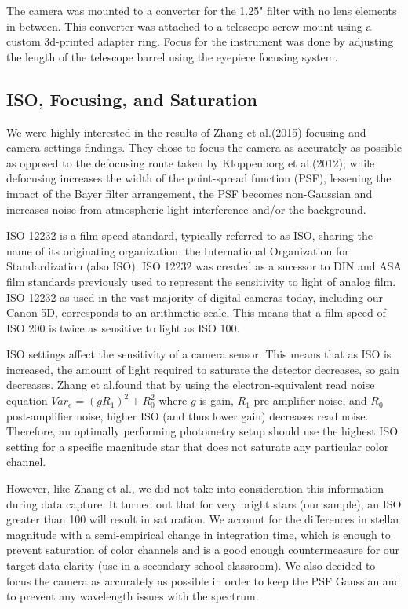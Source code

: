 \documentclass[prb,preprint]{revtex4-1}
\begin{document}
	The camera was mounted to a converter for the 1.25" filter with no lens elements in between. This converter was attached to a telescope screw-mount using a custom 3d-printed adapter ring. Focus for the instrument was done by adjusting the length of the telescope barrel using the eyepiece focusing system.

	\subsection{ISO, Focusing, and Saturation}

	We were highly interested in the results of Zhang et al.\@(2015)\cite{mbpdslr} focusing and camera settings findings. They chose to focus the camera as accurately as possible as opposed to the defocusing route taken by Kloppenborg et al.\@(2012);\cite{vbpdslr} while defocusing increases the width of the point-spread function (PSF), lessening the impact of the Bayer filter arrangement, the PSF becomes non-Gaussian and increases noise from atmospheric light interference and/or the background.

	ISO 12232 is a film speed standard\cite{12232}, typically referred to as ISO, sharing the name of its originating organization, the International Organization for Standardization (also ISO). ISO 12232 was created as a sucessor to DIN and ASA film standards previously used to represent the sensitivity to light of analog film. ISO 12232 as used in the vast majority of digital cameras today, including our Canon 5D, corresponds to an arithmetic scale. This means that a film speed of ISO 200 is twice as sensitive to light as ISO 100.

	ISO settings affect the sensitivity of a camera sensor. This means that as ISO is increased, the amount of light required to saturate the detector decreases, so gain decreases. Zhang et al.\cite{mbpdslr}\@ found that by using the electron-equivalent read noise equation $V ar_e = (gR_1)^2 + R^2_0$ where $g$ is gain, $R_1$ pre-amplifier noise, and $R_0$ post-amplifier noise, higher ISO (and thus lower gain) decreases read noise. Therefore, an optimally performing photometry setup should use the highest ISO setting for a specific magnitude star that does not saturate any particular color channel.

	However, like Zhang et al.,\cite{mbpdslr} we did not take into consideration this information during data capture. It turned out that for very bright stars (our sample), an ISO greater than 100 will result in saturation. We account for the differences in stellar magnitude with a semi-empirical change in integration time, which is enough to prevent saturation of color channels and is a good enough countermeasure for our target data clarity (use in a secondary school classroom). We also decided to focus the camera as accurately as possible in order to keep the PSF Gaussian and to prevent any wavelength issues with the spectrum.
\end{document}
